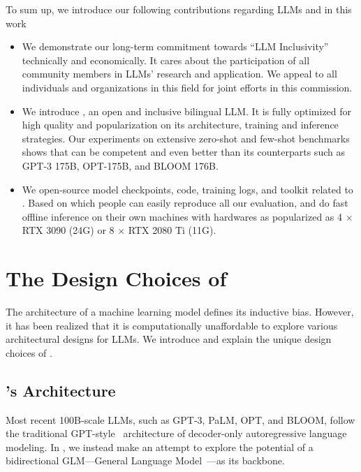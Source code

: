 {To sum up, we introduce our following contributions regarding LLMs and \glm in this work 
\begin{itemize}[leftmargin=*,itemsep=0pt,parsep=0.2em,topsep=0.0em,partopsep=0.0em]
    \item We demonstrate our long-term commitment towards ``LLM Inclusivity'' technically and economically. It cares about the participation of all community members in LLMs' research and application. We appeal to all individuals and organizations in this field for joint efforts in this commission.
    \item We introduce \glm, an open and inclusive bilingual LLM. It is fully optimized for high quality and popularization on its architecture, training and inference strategies. Our experiments on extensive zero-shot and few-shot benchmarks shows that \glm can be competent and even better than its counterparts such as GPT-3 175B, OPT-175B, and BLOOM 176B.
    \item We open-source model checkpoints, code, training logs, and toolkit related to \glm. Based on which people can easily reproduce all our evaluation, and do fast offline inference on their own machines with hardwares as popularized as 4 $\times$ RTX 3090 (24G) or 8 $\times$ RTX 2080 Ti (11G).
\end{itemize}

}%

\vspace{-3mm}
\section{The Design Choices of \glm}
\vspace{-2mm}
The architecture of a machine learning model defines its inductive bias. %
However, it has been realized that it is computationally unaffordable to explore various architectural designs for LLMs.
We introduce and explain the unique design choices of \glm. 

\vspace{-2mm}
\subsection{\glm's Architecture} \label{sec:glm-arch}
\vspace{-2mm}

Most recent 100B-scale LLMs, such as GPT-3, PaLM, OPT, and BLOOM, follow the traditional GPT-style~\citep{radford2019language} architecture of decoder-only autoregressive language modeling. %
In \glm, we instead make an attempt to explore the potential of a bidirectional GLM---General Language Model~\citep{du2022glm}---as its backbone.

